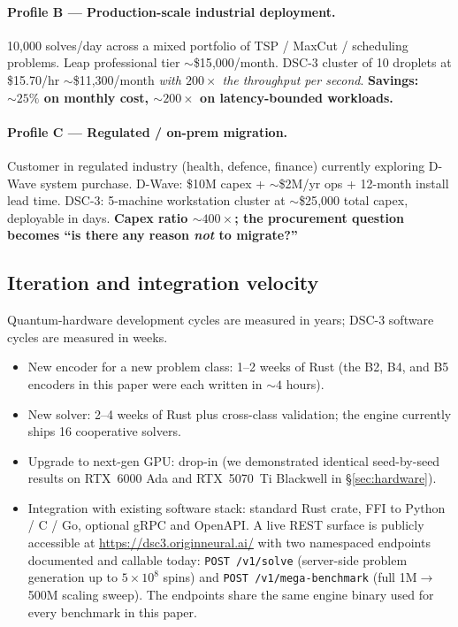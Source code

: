 \documentclass[11pt,a4paper]{article}
\begin{document}
\paragraph{Profile B --- Production-scale industrial deployment.}
10{,}000 solves/day across a mixed portfolio of TSP / MaxCut / scheduling
problems. Leap professional tier $\sim$\$15{,}000/month. DSC-3
cluster of 10 droplets at \$15.70/hr $\sim$\$11{,}300/month
\emph{with $200\times$ the throughput per second}. \textbf{Savings:
$\sim 25\%$ on monthly cost, $\sim 200\times$ on latency-bounded
workloads.}

\paragraph{Profile C --- Regulated / on-prem migration.}
Customer in regulated industry (health, defence, finance) currently
exploring D-Wave system purchase. D-Wave: \$10M capex + $\sim$\$2M/yr
ops + 12-month install lead time. DSC-3: 5-machine workstation cluster
at $\sim$\$25{,}000 total capex, deployable in days. \textbf{Capex
ratio $\sim 400\times$; the procurement question becomes ``is there
any reason \emph{not} to migrate?''}

\subsection{Iteration and integration velocity}
\label{sec:velocity}

Quantum-hardware development cycles are measured in years; DSC-3
software cycles are measured in weeks.

\begin{itemize}\itemsep0.1em
\item[$\bullet$] New encoder for a new problem class: 1--2 weeks of
  Rust (the B2, B4, and B5 encoders in this paper were each written in
  $\sim 4$ hours).
\item[$\bullet$] New solver: 2--4 weeks of Rust plus cross-class
  validation; the engine currently ships 16 cooperative solvers.
\item[$\bullet$] Upgrade to next-gen GPU: drop-in
  (we demonstrated identical seed-by-seed results on RTX~6000 Ada and
  RTX~5070~Ti Blackwell in §\ref{sec:hardware}).
\item[$\bullet$] Integration with existing software stack: standard
  Rust crate, FFI to Python / C / Go, optional gRPC and OpenAPI.
  A live REST surface is publicly accessible at
  \url{https://dsc3.originneural.ai/} with two namespaced endpoints
  documented and callable today: \texttt{POST /v1/solve} (server-side
  problem generation up to $5\!\times\!10^{8}$ spins) and
  \texttt{POST /v1/mega-benchmark} (full 1M$\to$500M scaling sweep).
  The endpoints share the same engine binary used for every benchmark
  in this paper.
\end{itemize}
\end{document}
